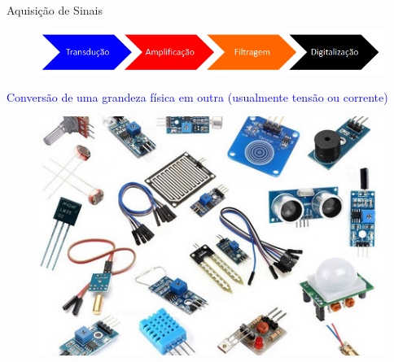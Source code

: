 \documentclass[aspectratio=169,
				xcolor=table]{beamer}
\begin{document}
	\begin{frame}{Aquisição de Sinais}
		
		\begin{figure}[hbtp]
			\centering
			\includegraphics[width=\textwidth, keepaspectratio]{../figs/cap01/sistema01.png}
		\end{figure}	
		
		\textcolor{blue}{Conversão de uma grandeza física em outra (usualmente tensão ou corrente)}
		
		\begin{figure}[hbtp]
			\centering
			\includegraphics[height=0.4\textheight, keepaspectratio]{../figs/cap01/transdutores}
		\end{figure}	
					
	\end{frame}
	
\end{document}
